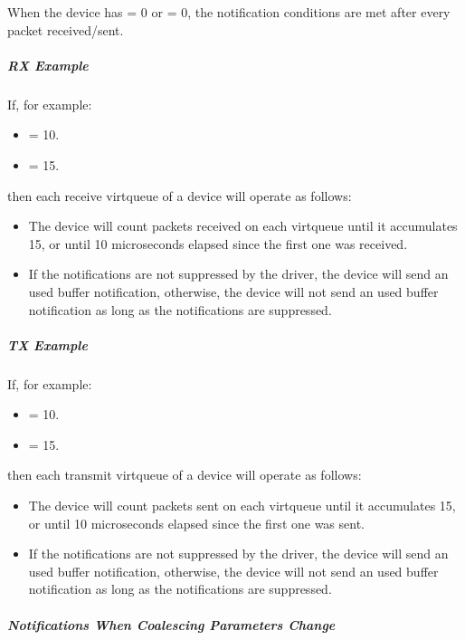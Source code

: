 When the device has  = 0 or  = 0, the notification conditions are met after every packet received/sent.

\subparagraph{RX Example}\label{sec:Device Types / Network Device / Device Operation / Control Virtqueue / Notifications Coalescing / RX Example}

If, for example:
\begin{itemize}
\item {} = 10.
\item {} = 15.
\end{itemize}
then each receive virtqueue of a device will operate as follows:
\begin{itemize}
\item The device will count packets received on each virtqueue until it accumulates 15, or until 10 microseconds elapsed since the first one was received.
\item If the notifications are not suppressed by the driver, the device will send an used buffer notification, otherwise, the device will not send an used buffer notification as long as the notifications are suppressed.
\end{itemize}

\subparagraph{TX Example}\label{sec:Device Types / Network Device / Device Operation / Control Virtqueue / Notifications Coalescing / TX Example}

If, for example:
\begin{itemize}
\item {} = 10.
\item {} = 15.
\end{itemize}
then each transmit virtqueue of a device will operate as follows:
\begin{itemize}
\item The device will count packets sent on each virtqueue until it accumulates 15, or until 10 microseconds elapsed since the first one was sent.
\item If the notifications are not suppressed by the driver, the device will send an used buffer notification, otherwise, the device will not send an used buffer notification as long as the notifications are suppressed.
\end{itemize}

\subparagraph{Notifications When Coalescing Parameters Change}\label{sec:Device Types / Network Device / Device Operation / Control Virtqueue / Notifications Coalescing / Notifications When Coalescing Parameters Change}

